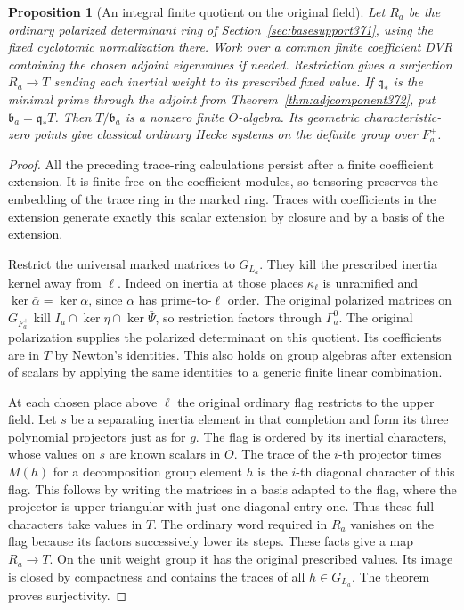\documentclass[a4paper,11pt]{article}
\newtheorem{proposition}{Proposition}[section]
\theoremstyle{definition}
\theoremstyle{remark}
\numberwithin{equation}{section}
\begin{document}
\begin{proposition}[An integral finite quotient on the original field]
\label{prop:orighecke374}
Let \(R_a\) be the ordinary polarized determinant ring of
Section~\ref{sec:basesupport371}, using the fixed cyclotomic
normalization there. Work over a common finite coefficient
DVR containing the chosen adjoint eigenvalues if needed.
Restriction gives a surjection \(R_a\to T\) sending each
inertial weight to its prescribed fixed value. If
\(\mathfrak q_*\) is the minimal prime through the adjoint
from Theorem~\ref{thm:adjcomponent372}, put
\(\mathfrak b_a=\mathfrak q_* T\). Then \(T/\mathfrak b_a\)
is a nonzero finite \(O\)-algebra. Its geometric
characteristic-zero points give classical ordinary Hecke
systems on the definite group over \(F_a^+\).
\end{proposition}
\begin{proof}
All the preceding trace-ring calculations persist after a
finite coefficient extension. It is finite free on the
coefficient modules, so tensoring preserves the embedding
of the trace ring in the marked ring. Traces with coefficients
in the extension generate exactly this scalar extension by
closure and by a basis of the extension.

Restrict the universal marked matrices to \(G_{L_a}\). They
kill the prescribed inertia kernel away from \(\ell\).
Indeed on inertia at those places \(\kappa_\ell\) is
unramified and \(\ker\bar\alpha=\ker\alpha\), since
\(\alpha\) has prime-to-\(\ell\) order. The original
polarized matrices on \(G_{F_a^+}\) kill
\(I_u\cap\ker\eta\cap\ker\bar\Psi\), so restriction factors
through \(\Gamma_a^0\). The original polarization supplies
the polarized determinant on this quotient. Its coefficients
are in \(T\) by Newton's identities. This also holds on
group algebras after extension of scalars by applying the
same identities to a generic finite linear combination.

At each chosen place above \(\ell\) the original ordinary
flag restricts to the upper field. Let \(s\) be a separating
inertia element in that completion and form its three
polynomial projectors just as for \(g\). The flag is ordered
by its inertial characters, whose values on \(s\) are known
scalars in \(O\). The trace of the \(i\)-th projector times
\(M(h)\) for a decomposition group element \(h\) is the
\(i\)-th diagonal character of this flag. This follows by
writing the matrices in a basis adapted to the flag, where
the projector is upper triangular with just one diagonal
entry one. Thus these full characters take values in \(T\).
The ordinary word required in \(R_a\) vanishes on the flag
because its factors successively lower its steps. These
facts give a map \(R_a\to T\). On the unit weight group
it has the original prescribed values. Its image is closed
by compactness and contains the traces of all \(h\in G_{L_a}\).
The theorem proves surjectivity.


\end{proof}
\end{document}
